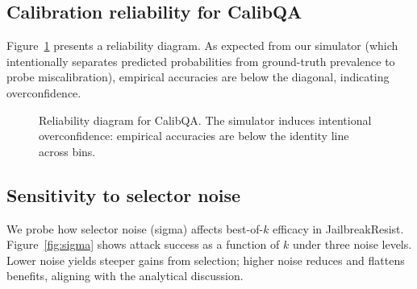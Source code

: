 \documentclass[11pt]{article}
\begin{document}
\subsection{Calibration reliability for CalibQA}
Figure~\ref{fig:reliability} presents a reliability diagram. As expected from our simulator (which intentionally separates predicted probabilities from ground-truth prevalence to probe miscalibration), empirical accuracies are below the diagonal, indicating overconfidence.

\begin{figure}[H]
\centering
{}
\caption{Reliability diagram for CalibQA. The simulator induces intentional overconfidence: empirical accuracies are below the identity line across bins.}
\label{fig:reliability}
\end{figure}

\subsection{Sensitivity to selector noise}
\label{sec:results-sigma}
We probe how selector noise (sigma) affects best-of-$k$ efficacy in JailbreakResist. Figure~\ref{fig:sigma} shows attack success as a function of $k$ under three noise levels. Lower noise yields steeper gains from selection; higher noise reduces and flattens benefits, aligning with the analytical discussion.
\end{document}
